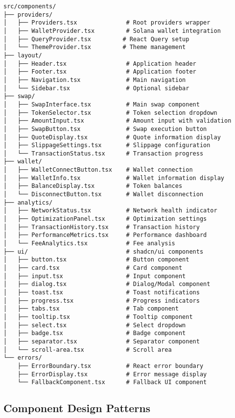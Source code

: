 \documentclass[11pt,a4paper]{article}
\begin{document}
\begin{lstlisting}[style=typescript, caption=Component Hierarchy Tree]
src/components/
├── providers/
│   ├── Providers.tsx              # Root providers wrapper
│   ├── WalletProvider.tsx         # Solana wallet integration
│   ├── QueryProvider.tsx         # React Query setup
│   └── ThemeProvider.tsx         # Theme management
├── layout/
│   ├── Header.tsx                 # Application header
│   ├── Footer.tsx                 # Application footer
│   ├── Navigation.tsx             # Main navigation
│   └── Sidebar.tsx                # Optional sidebar
├── swap/
│   ├── SwapInterface.tsx          # Main swap component
│   ├── TokenSelector.tsx          # Token selection dropdown
│   ├── AmountInput.tsx            # Amount input with validation
│   ├── SwapButton.tsx             # Swap execution button
│   ├── QuoteDisplay.tsx           # Quote information display
│   ├── SlippageSettings.tsx       # Slippage configuration
│   └── TransactionStatus.tsx      # Transaction progress
├── wallet/
│   ├── WalletConnectButton.tsx    # Wallet connection
│   ├── WalletInfo.tsx             # Wallet information display
│   ├── BalanceDisplay.tsx         # Token balances
│   └── DisconnectButton.tsx       # Wallet disconnection
├── analytics/
│   ├── NetworkStatus.tsx          # Network health indicator
│   ├── OptimizationPanel.tsx      # Optimization settings
│   ├── TransactionHistory.tsx     # Transaction history
│   ├── PerformanceMetrics.tsx     # Performance dashboard
│   └── FeeAnalytics.tsx           # Fee analysis
├── ui/                            # shadcn/ui components
│   ├── button.tsx                 # Button component
│   ├── card.tsx                   # Card component
│   ├── input.tsx                  # Input component
│   ├── dialog.tsx                 # Dialog/Modal component
│   ├── toast.tsx                  # Toast notifications
│   ├── progress.tsx               # Progress indicators
│   ├── tabs.tsx                   # Tab component
│   ├── tooltip.tsx                # Tooltip component
│   ├── select.tsx                 # Select dropdown
│   ├── badge.tsx                  # Badge component
│   ├── separator.tsx              # Separator component
│   └── scroll-area.tsx            # Scroll area
└── errors/
    ├── ErrorBoundary.tsx          # React error boundary
    ├── ErrorDisplay.tsx           # Error message display
    └── FallbackComponent.tsx      # Fallback UI component
\end{lstlisting}

\subsection{Component Design Patterns}
\end{document}

